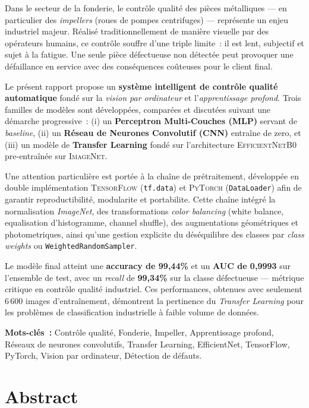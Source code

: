 \documentclass[12pt,a4paper,openany]{report}
\begin{document}
Dans le secteur de la fonderie, le contrôle qualité des pièces métalliques --- en particulier des \emph{impellers} (roues de pompes centrifuges) --- représente un enjeu industriel majeur. Réalisé traditionnellement de manière visuelle par des opérateurs humains, ce contrôle souffre d'une triple limite~: il est lent, subjectif et sujet à la fatigue. Une seule pièce défectueuse non détectée peut provoquer une défaillance en service avec des conséquences coûteuses pour le client final.

Le présent rapport propose un \textbf{système intelligent de contrôle qualité automatique} fondé sur la \emph{vision par ordinateur} et l'\emph{apprentissage profond}. Trois familles de modèles sont développées, comparées et discutées suivant une démarche progressive~: (i) un \textbf{Perceptron Multi-Couches (MLP)} servant de \emph{baseline}, (ii) un \textbf{Réseau de Neurones Convolutif (CNN)} entraîne de zero, et (iii) un modèle de \textbf{Transfer Learning} fondé sur l'architecture \textsc{EfficientNetB0} pre-entraînée sur \textsc{ImageNet}.

Une attention particulière est portée à la chaîne de prétraitement, développée en double implémentation \textsc{TensorFlow} (\texttt{tf.data}) et \textsc{PyTorch} (\texttt{DataLoader}) afin de garantir reproductibilité, modularite et portabilite. Cette chaîne intégré la normalisation \emph{ImageNet}, des transformations \emph{color balancing} (white balance, equalisation d'histogramme, channel shuffle), des augmentations géométriques et photometriques, ainsi qu'une gestion explicite du déséquilibre des classes par \emph{class weights} ou \texttt{WeightedRandomSampler}.

Le modèle final atteint une \textbf{accuracy de 99{,}44\%} et un \textbf{AUC de 0{,}9993} sur l'ensemble de test, avec un \emph{recall} de \textbf{99{,}34\%} sur la classe défectueuse --- métrique critique en contrôle qualité industriel. Ces performances, obtenues avec seulement 6\,600 images d'entraînement, démontrent la pertinence du \emph{Transfer Learning} pour les problèmes de classification industrielle à faible volume de données.

\vspace{0.4cm}
\noindent\textbf{Mots-clés~:} Contrôle qualité, Fonderie, Impeller, Apprentissage profond, Réseaux de neurones convolutifs, Transfer Learning, EfficientNet, TensorFlow, PyTorch, Vision par ordinateur, Détection de défauts.

\chapter*{Abstract}
\thispagestyle{fancy}
\end{document}
